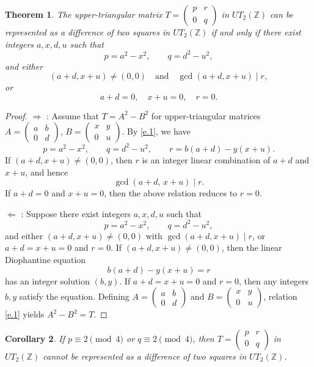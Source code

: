 \documentclass[11pt]{amsart}
\newtheorem{theorem}{Theorem}%
\newtheorem{corollary}[theorem]{Corollary}
\def\Z{\mathbb{Z}}
\begin{document}
\begin{theorem}\label{thm:main-criterion}
The upper-triangular matrix
$T=\begin{pmatrix}p&r\\0&q\end{pmatrix}$ in $UT_2(\Z)$
can be represented as a difference of two squares in $UT_2(\Z)$  if and only if there exist integers $a,x,d,u$ such that
$$p=a^2-x^2,\qquad q=d^2-u^2,$$
and either
$$(a+d,x+u)\neq(0,0)\quad\text{and}\quad \gcd(a+d,x+u)\mid r,$$
or
$$a+d=0,\quad x+u=0,\quad r=0.$$
\end{theorem}
\begin{proof} $\boxed{\Rightarrow}$ : 
Assume  that $T=A^2-B^2$ for  upper-triangular matrices
$A=\begin{pmatrix}a&b\\0&d\end{pmatrix}$, $B=\begin{pmatrix}x&y\\0&u\end{pmatrix}$.
By \eqref{e.1}, we have 
$$p=a^2-x^2, \qquad q=d^2-u^2, \qquad r=b(a+d)-y(x+u).$$
If $(a+d,x+u)\neq(0,0)$, then $r$ is an integer linear combination of $a+d$ and $x+u$, and hence
$$\gcd(a+d,\,x+u)\mid r.$$
If $a+d=0$ and $x+u=0$, then the above relation reduces to $r=0$.

$\boxed{\Leftarrow}$ : Suppose there exist integers $a,x,d,u$ such that
$$p=a^2-x^2, \qquad q=d^2-u^2,$$
and either $(a+d,x+u)\neq(0,0)$ with $\gcd(a+d,x+u)\mid r$, or $a+d=x+u=0$ and $r=0$. If $(a+d,x+u)\neq(0,0)$, then the linear Diophantine equation
$$b(a+d)-y(x+u)=r$$
has an integer solution $(b,y)$. If $a+d=x+u=0$ and $r=0$, then any integers $b,y$ satisfy the equation. Defining $A=\begin{pmatrix}a&b\\0&d\end{pmatrix}$ and 
$B=\begin{pmatrix}x&y\\0&u\end{pmatrix}$, relation \eqref{e.1} yields $A^2-B^2=T$.
\end{proof}






\begin{corollary}\label{cor:diag-obstruction}
If $p\equiv 2\pmod 4$ or $q\equiv 2\pmod 4$, then $T=\begin{pmatrix}p&r\\0&q\end{pmatrix}$ in $UT_2(\Z)$ cannot be represented as a difference of two squares in $UT_2(\Z)$.
\end{corollary}
\end{document}
